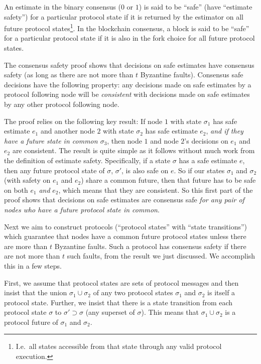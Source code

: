 \documentclass{article}
\theoremstyle{definition}
\begin{document}
An estimate in the binary consensus ($0$ or $1$) is said to be ``safe'' (have ``estimate safety'') for a particular protocol state if it is returned by the estimator on all future protocol states\footnote{I.e.\ all states accessible from that state through any valid protocol execution.}. In the blockchain consensus, a block is said to be ``safe'' for a particular protocol state if it is also in the fork choice for all future protocol states.

The consensus safety proof shows that decisions on safe estimates have consensus safety (as long as there are not more than $t$ Byzantine faults). Consensus safe decisions have the following property: any decisions made on safe estimates by a protocol following node will be \emph{consistent} with decisions made on safe estimates by any other protocol following node.

The proof relies on the following key result: If node $1$ with state $\sigma_1$ has safe estimate $e_1$ and another node $2$ with state $\sigma_2$ has safe estimate $e_2$, \emph{and if they have a future state in common $\sigma_3$}, then node $1$ and node $2$'s decisions on $e_1$ and $e_2$ are consistent. The result is quite simple as it follows without much work from the definition of estimate safety. Specifically, if a state $\sigma$ has a safe estimate $e$, then any future protocol state of $\sigma$, $\sigma'$, is also safe on $e$. So if our states $\sigma_1$ and $\sigma_2$ (with safety on $e_1$ and $e_2$) share a common future, then that future has to be safe on both $e_1$ \emph{and} $e_2$, which means that they are consistent. So this first part of the proof shows that decisions on safe estimates are consensus safe \emph{for any pair of nodes who have a future protocol state in common}.

Next we aim to construct protocols (``protocol states'' with ``state transitions'') which guarantee that nodes have a common future protocol states unless there are more than $t$ Byzantine faults. Such a protocol has consensus safety if there are not more than $t$ such faults, from the result we just discussed. We accomplish this in a few steps.

First, we assume that protocol states are sets of protocol messages and then insist that the union $\sigma_1 \cup \sigma_2$ of any two protocol states $\sigma_1$ and $\sigma_2$ is itself a protocol state. Further, we insist that there is a state transition from each protocol state $\sigma$ to $\sigma' \supset \sigma$ (any superset of $\sigma$). This means that $\sigma_1 \cup \sigma_2$ is a protocol future of $\sigma_1$ and $\sigma_2$.
\end{document}
